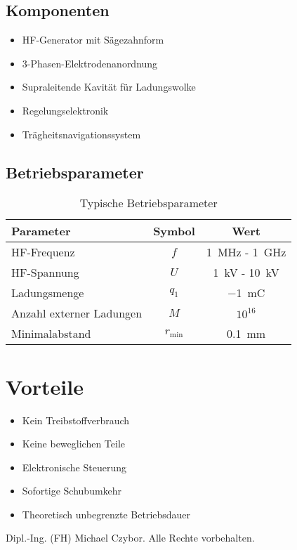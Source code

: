 \documentclass[11pt, a4paper]{article}
\begin{document}
\subsection{Komponenten}

\begin{itemize}
    \item HF-Generator mit Sägezahnform
    \item 3-Phasen-Elektrodenanordnung
    \item Supraleitende Kavität für Ladungswolke
    \item Regelungselektronik
    \item Trägheitsnavigationssystem
\end{itemize}

\subsection{Betriebsparameter}

\begin{table}[ht]
\centering
\begin{tabular}{lcc}
\toprule
Parameter & Symbol & Wert \\
\midrule
HF-Frequenz & $f$ & \SI{1}{\mega\hertz} - \SI{1}{\giga\hertz} \\
HF-Spannung & $U$ & \SI{1}{\kilo\volt} - \SI{10}{\kilo\volt} \\
Ladungsmenge & $q_1$ & \SI{-1}{\milli\coulomb} \\
Anzahl externer Ladungen & $M$ & $10^{16}$ \\
Minimalabstand & $r_{\text{min}}$ & \SI{0.1}{\milli\meter} \\
\bottomrule
\end{tabular}
\caption{Typische Betriebsparameter}
\end{table}

\section{Vorteile}

\begin{itemize}
    \item Kein Treibstoffverbrauch
    \item Keine beweglichen Teile
    \item Elektronische Steuerung
    \item Sofortige Schubumkehr
    \item Theoretisch unbegrenzte Betriebsdauer
\end{itemize}

\textcopyright{} \the\year{} Dipl.-Ing. (FH) Michael Czybor. Alle Rechte vorbehalten.
\end{document}
